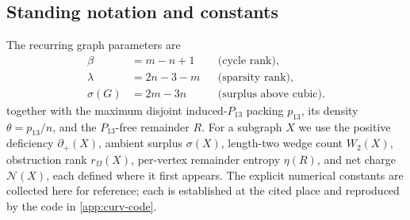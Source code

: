 \documentclass[11pt]{article}
\newcommand{\defp}{\partial_+}
\newcommand{\No}{\mathcal N}
\begin{document}
\subsection*{Standing notation and constants}

The recurring graph parameters are
\[
\begin{aligned}
\beta&=m-n+1 &&\text{(cycle rank)},\\
\lambda&=2n-3-m &&\text{(sparsity rank)},\\
\sigma(G)&=2m-3n &&\text{(surplus above cubic)} .
\end{aligned}
\]
together with the maximum disjoint induced-$P_{13}$ packing $p_{13}$, its density $\theta=p_{13}/n$, and the $P_{13}$-free remainder $R$.  For a subgraph $X$ we use the positive deficiency $\defp(X)$, ambient surplus $\sigma(X)$, length-two wedge count $W_2(X)$, obstruction rank $r_\Omega(X)$, per-vertex remainder entropy $\eta(R)$, and net charge $\No(X)$, each defined where it first appears.  The explicit numerical constants are collected here for reference; each is established at the cited place and reproduced by the code in \cref{app:curv-code}.
\end{document}

